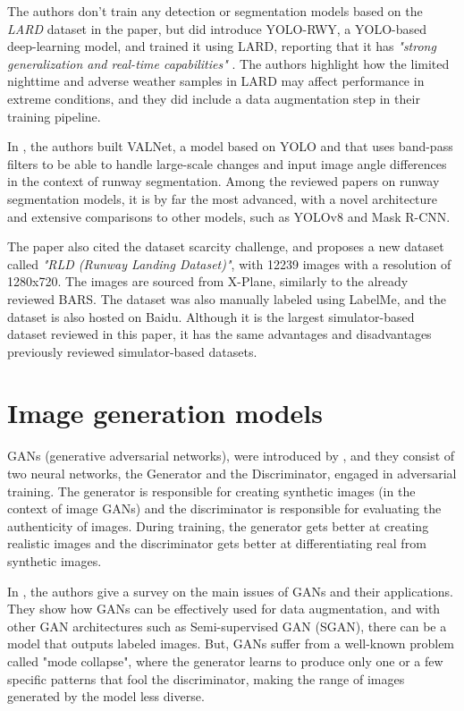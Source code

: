 The authors don't train any detection or segmentation models based on the
\emph{LARD} dataset in the paper, but \cite{li_yolo-rwy_2024} did introduce
YOLO-RWY, a YOLO-based \cite{redmon_you_2016} deep-learning model, and trained it using LARD, reporting that it has \emph{"strong generalization and real-time capabilities"} \cite{li_yolo-rwy_2024}. The authors highlight how the limited nighttime and adverse weather samples in LARD may affect performance in extreme conditions, and they did include a data augmentation step in their training pipeline.

In \cite{wang_valnet_2024}, the authors built VALNet, a model based on YOLO and that uses band-pass filters to be able to handle large-scale changes and input image angle differences in the context of runway segmentation. Among the reviewed papers on runway segmentation models, it is by far the most advanced, with a novel architecture and extensive comparisons to other models, such as YOLOv8 and Mask R-CNN.

The paper also cited the dataset scarcity challenge, and proposes a new dataset called \emph{"RLD (Runway Landing Dataset)"}, with 12239 images with a resolution of 1280x720. The images are sourced from X-Plane, similarly to the already reviewed BARS. The dataset was also manually labeled using LabelMe, and the dataset is also hosted on Baidu. Although it is the largest simulator-based dataset reviewed in this paper, it has the same advantages and disadvantages previously reviewed simulator-based datasets.

\section{Image generation models}

GANs (generative adversarial networks), were introduced by \cite{goodfellow_generative_2014}, and they consist of two neural networks, the Generator and the Discriminator, engaged in adversarial training. The generator is responsible for creating synthetic images (in the context of image GANs) and the discriminator is responsible for evaluating the authenticity of images. During training, the generator gets better at creating realistic images and the discriminator gets better at differentiating real from synthetic images.

In \cite{cohen_generative_2022}, the authors give a survey on the main issues of GANs and their applications. They show how GANs can be effectively used for data augmentation, and with other GAN architectures such as Semi-supervised GAN (SGAN), there can be a model that outputs labeled images. But, GANs suffer from a well-known problem called "mode collapse", where the generator learns to produce only one or a few specific patterns that fool the discriminator, making the range of images generated by the model less diverse.

